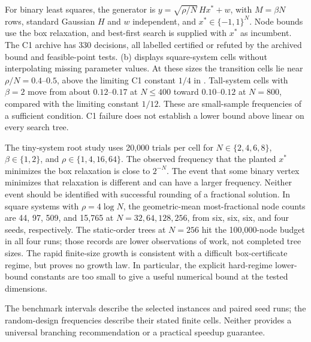For binary least squares, the generator is
$y=\sqrt{\rho/N}\,H x^*+w$, with $M=\beta N$ rows, standard Gaussian
$H$ and $w$ independent, and $x^*\in\{-1,1\}^N$. Node bounds use the box relaxation, and
best-first search is supplied with $x^*$ as incumbent.
The C1 archive has 330 decisions, all labelled certified or refuted by
the archived bound and feasible-point tests.
(b) displays square-system cells without
interpolating missing parameter values. At these sizes the transition
cells lie near $\rho/N=0.4$--$0.5$, above the limiting C1 constant $1/4$
in . Tall-system cells with $\beta=2$
move from about $0.12$--$0.17$ at $N\leq400$ toward $0.10$--$0.12$ at
$N=800$, compared with the limiting constant $1/12$.
These are small-sample frequencies of a sufficient condition. C1 failure
does not establish a lower bound above linear on every search tree.

The tiny-system root study uses 20,000 trials per cell for
$N\in\{2,4,6,8\}$, $\beta\in\{1,2\}$, and
$\rho\in\{1,4,16,64\}$.
The observed frequency that the planted $x^*$ minimizes the box relaxation
is close to $2^{-N}$. The event that some binary vertex minimizes that
relaxation is different and can have a larger frequency. Neither event
should be identified with successful rounding of a fractional solution.
In square systems with $\rho=4\log N$, the geometric-mean
most-fractional node counts are 44, 97, 509, and 15,765 at
$N=32,64,128,256$, from six, six, six, and four seeds, respectively.
The static-order trees at $N=256$ hit the 100,000-node budget in all
four runs; those records are lower observations of work, not completed
tree sizes. The rapid finite-size growth is consistent with a difficult
box-certificate regime, but proves no growth law. In particular, the
explicit hard-regime lower-bound constants are too small to give a useful
numerical bound at the tested dimensions.

The benchmark intervals describe the selected instances and paired seed
runs; the random-design frequencies describe their stated finite cells.
Neither provides a universal branching recommendation or a practical
speedup guarantee.
